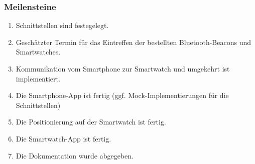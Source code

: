 \subsubsection{Meilensteine}
\begin{enumerate}
	\item Schnittstellen sind festegelegt.
	\item Geschätzter Termin für das Eintreffen der bestellten Bluetooth-Beacons und Smartwatches.
	\item Kommunikation vom Smartphone zur Smartwatch und umgekehrt ist implementiert.
	\item Die Smartphone-App ist fertig (ggf. Mock-Implementierungen für die Schnittstellen)
	\item Die Positionierung auf der Smartwatch ist fertig.
	\item Die Smartwatch-App ist fertig.
	\item Die Dokumentation wurde abgegeben.
\end{enumerate}
